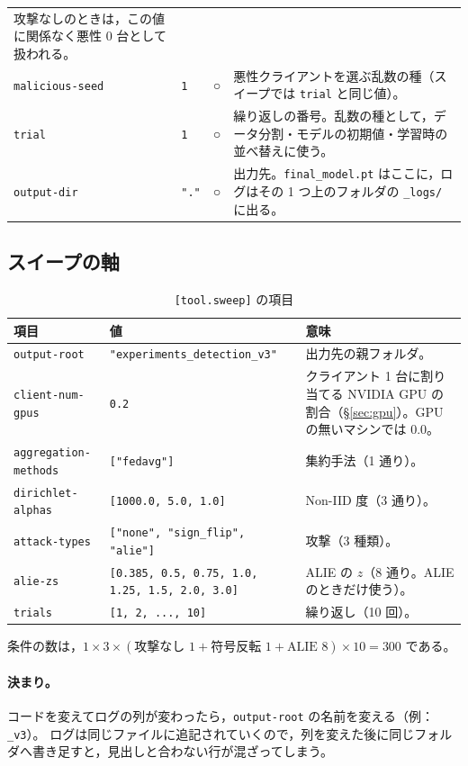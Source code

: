 \documentclass[a4j, dvipdfmx]{jsarticle}  %
\begin{document}
\begin{table}[H]
\begin{tabular}{@{}P{3.5cm} P{2.0cm} P{1.2cm} P{8.2cm}@{}}
攻撃なしのときは，この値に関係なく悪性 0 台として扱われる。 \\
\texttt{malicious-seed} & \texttt{1} & ○ & 悪性クライアントを選ぶ乱数の種（スイープでは \texttt{trial} と同じ値）。 \\
\texttt{trial} & \texttt{1} & ○ & 繰り返しの番号。乱数の種として，データ分割・モデルの初期値・学習時の並べ替えに使う。 \\
\texttt{output-dir} & \texttt{"."} & ○ & 出力先。\texttt{final\_model.pt} はここに，ログはその 1 つ上のフォルダの \texttt{\_logs/} に出る。 \\
\bottomrule
\end{tabular}
\end{table}

\subsection{スイープの軸}

\begin{table}[H]
\centering
\caption{\texttt{[tool.sweep]} の項目}
\begin{tabular}{@{}P{3.6cm} P{5.2cm} P{6.5cm}@{}}
\toprule
項目 & 値 & 意味 \\
\midrule
\texttt{output-root} & \texttt{"experiments\_detection\_v3"} & 出力先の親フォルダ。 \\
\texttt{client-num-gpus} & \texttt{0.2} & クライアント 1 台に割り当てる NVIDIA GPU の割合（\S\ref{sec:gpu}）。GPU の無いマシンでは 0.0。 \\
\texttt{aggregation-methods} & \texttt{["fedavg"]} & 集約手法（1 通り）。 \\
\texttt{dirichlet-alphas} & \texttt{[1000.0, 5.0, 1.0]} & Non-IID 度（3 通り）。 \\
\texttt{attack-types} & \texttt{["none", "sign\_flip", "alie"]} & 攻撃（3 種類）。 \\
\texttt{alie-zs} & \texttt{[0.385, 0.5, 0.75, 1.0, 1.25, 1.5, 2.0, 3.0]} & ALIE の $z$（8 通り。ALIE のときだけ使う）。 \\
\texttt{trials} & \texttt{[1, 2, ..., 10]} & 繰り返し（10 回）。 \\
\bottomrule
\end{tabular}
\end{table}

条件の数は，$1 \times 3 \times (\text{攻撃なし } 1 + \text{符号反転 } 1 + \text{ALIE } 8) \times 10 = 300$ である。

\paragraph{決まり。}
コードを変えてログの列が変わったら，\texttt{output-root} の名前を変える（例：\texttt{\_v3}）。
ログは同じファイルに追記されていくので，列を変えた後に同じフォルダへ書き足すと，見出しと合わない行が混ざってしまう。
\end{document}
